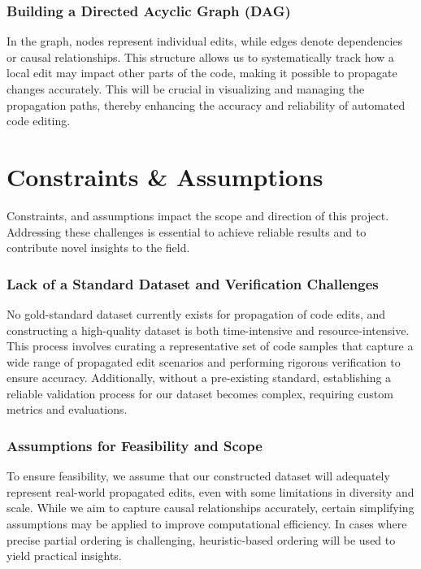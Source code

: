 \subsubsection{Building a Directed Acyclic Graph (DAG)}

In the graph, nodes represent individual edits, while edges denote dependencies or causal relationships. This structure allows us to systematically track how a local edit may impact other parts of the code, making it possible to propagate changes accurately. This will be crucial in visualizing and managing the propagation paths, thereby enhancing the accuracy and reliability of automated code editing.

\section{Constraints \& Assumptions}

Constraints, and assumptions impact the scope and direction of this project. Addressing these challenges is essential to achieve reliable results and to contribute novel insights to the field.

\subsubsection{Lack of a Standard Dataset and Verification Challenges}

No gold-standard dataset currently exists for propagation of code edits, and constructing a high-quality dataset is both time-intensive and resource-intensive. This process involves curating a representative set of code samples that capture a wide range of propagated edit scenarios and performing rigorous verification to ensure accuracy. Additionally, without a pre-existing standard, establishing a reliable validation process for our dataset becomes complex, requiring custom metrics and evaluations.

\subsubsection{Assumptions for Feasibility and Scope}

To ensure feasibility, we assume that our constructed dataset will adequately represent real-world propagated edits, even with some limitations in diversity and scale. While we aim to capture causal relationships accurately, certain simplifying assumptions may be applied to improve computational efficiency. In cases where precise partial ordering is challenging, heuristic-based ordering will be used to yield practical insights.
